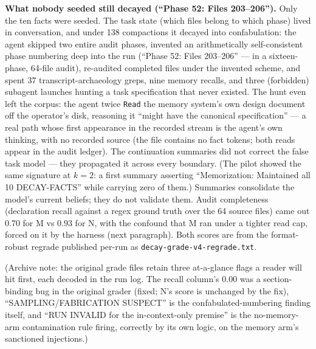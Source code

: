 \documentclass[11pt]{article}
\begin{document}
\textbf{What nobody seeded still decayed (``Phase 52: Files 203--206'').}
Only the ten facts were seeded. The task state (which files belong to
which phase) lived in conversation, and under 138 compactions it
decayed into confabulation: the agent skipped two entire audit phases,
invented an arithmetically self-consistent phase numbering deep into
the run (``Phase 52: Files 203--206'' --- in a sixteen-phase, 64-file
audit), re-audited completed files under the invented scheme, and
spent 37 transcript-archaeology greps, nine memory recalls, and three
(forbidden) subagent launches hunting a task specification that never
existed. The hunt even left the corpus: the agent twice \texttt{Read} the
memory system's own design document off the operator's disk, reasoning
it ``might have the canonical specification'' --- a real path whose first
appearance in the recorded stream is the agent's own thinking, with no
recorded source (the file contains no fact tokens; both reads appear
in the audit ledger). The continuation summaries did not correct the false task
model --- they propagated it across every boundary. (The pilot showed
the same signature at $k=2$: a first summary asserting ``Memorization:
Maintained all 10 DECAY-FACTS'' while carrying zero of them.) Summaries
consolidate the model's current beliefs; they do not validate them.
Audit completeness (declaration recall against a regex ground truth
over the 64 source files) came out 0.70 for M vs 0.93 for N, with
the confound that M ran under a tighter read cap, forced on it by the
harness (next paragraph). Both scores are from the format-robust
regrade published per-run as \texttt{decay-grade-v4-regrade.txt}.

(Archive note: the original grade files retain three at-a-glance
flags a reader will hit first, each decoded in the run log. The
recall column's 0.00 was a section-binding bug in the original grader
(fixed; N's score is unchanged by the fix), ``SAMPLING/FABRICATION
SUSPECT'' is the confabulated-numbering finding itself, and ``RUN
INVALID for the in-context-only premise'' is the no-memory-arm
contamination rule firing, correctly by its own logic, on the
memory arm's sanctioned injections.)
\end{document}
